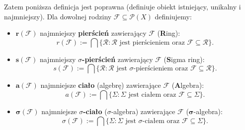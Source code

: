 Zatem poniższa definicja jest poprawna (definiuje obiekt istniejący, unikalny i najmniejszy).
Dla dowolnej rodziny $\mathcal{F} \subseteq \mathcal{P}(X)$ definiujemy:
    \begin{itemize}
        \item $\bm{r(\mathcal{F})}$  najmniejszy \textbf{pierścień} zawierający $\mathcal{F}$ (\textbf{R}ing):
		\[
		r\left( \mathcal{F} \right) := \bigcap \{\mathcal{R}: \mathcal{R}\text{ jest pierścieniem oraz }\mathcal{F}\subseteq \mathcal{R}\}  
		.\] 
        \item $\bm{s(\mathcal{F})}$ najmniejszy \textbf{$\sigma$-pierścień} zawierający $\mathcal{F}$ (\textbf{S}igma ring):
		\[
			s\left( \mathcal{F} \right) := \bigcap \{\mathcal{R}: \mathcal{R}\text{ jest $\sigma$-pierścieniem oraz }\mathcal{F}\subseteq \mathcal{R}\} 
		.\] 
        \item $\bm{a(\mathcal{F})}$  najmniejsze \textbf{ciało} (algebrę) zawierające $\mathcal{F}$ (\textbf{A}lgebra):
		\[
		a\left( \mathcal{F} \right) := \bigcap \{\Sigma : \Sigma \text{ jest ciałem oraz }\mathcal{F}\subseteq \Sigma \}
		.\] 
	\item $\bm{\sigma(\mathcal{F})}$  najmniejsze \textbf{$\sigma$-ciało} ($\sigma$-algebra) zawierające $\mathcal{F}$ ($\bm{\sigma}$-algebra):
		\[
		\sigma\left( \mathcal{F} \right) := \bigcap \{\Sigma : \Sigma \text{ jest $\sigma$-ciałem oraz }\mathcal{F}\subseteq \Sigma \}
		.\] 
    \end{itemize}


